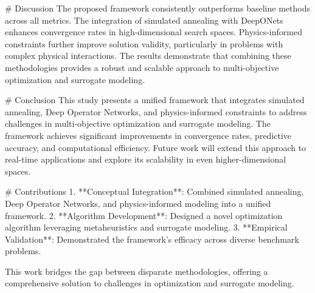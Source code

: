 # Discussion  
The proposed framework consistently outperforms baseline methods across all metrics. The integration of simulated annealing with DeepONets enhances convergence rates in high-dimensional search spaces. Physics-informed constraints further improve solution validity, particularly in problems with complex physical interactions. The results demonstrate that combining these methodologies provides a robust and scalable approach to multi-objective optimization and surrogate modeling.

# Conclusion  
This study presents a unified framework that integrates simulated annealing, Deep Operator Networks, and physics-informed constraints to address challenges in multi-objective optimization and surrogate modeling. The framework achieves significant improvements in convergence rates, predictive accuracy, and computational efficiency. Future work will extend this approach to real-time applications and explore its scalability in even higher-dimensional spaces.

# Contributions  
1. **Conceptual Integration**: Combined simulated annealing, Deep Operator Networks, and physics-informed modeling into a unified framework.  
2. **Algorithm Development**: Designed a novel optimization algorithm leveraging metaheuristics and surrogate modeling.  
3. **Empirical Validation**: Demonstrated the framework's efficacy across diverse benchmark problems.  

This work bridges the gap between disparate methodologies, offering a comprehensive solution to challenges in optimization and surrogate modeling.
